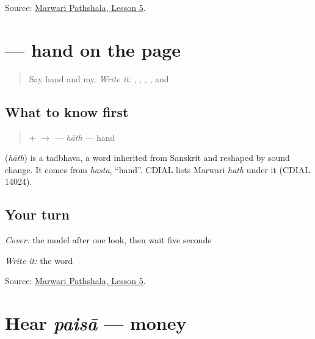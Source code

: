 \begin{tcolorbox}[breakable,colback=teal!4,colframe=teal!35!black,title={Before you move on}]
Source: \href{https://www.marwaripathshala.com/marwari-lesson-5-english}{Marwari Pathshala, Lesson 5}.
\end{tcolorbox}
\section[\texorpdfstring{\mw{हाथ} (hāth)}{हाथ (hāth)}]{ — hand on the page}

\label{lesson:MW-C10-haath}



\begin{quote}
Say hand and my. \emph{Write it:} \textbf{}, \textbf{}, \textbf{}, \textbf{}, and \textbf{}
\end{quote}

\subsection*{What to know first}
\begin{quote}
\textbf{} + \textbf{} $\to$ \textbf{} — \emph{hāth} — hand
\end{quote}

\begin{cousinweb}
\textbf{} (\emph{hāth}) is a tadbhava, a word inherited from Sanskrit and reshaped by sound change. It comes from \emph{hasta}, \textquotedblleft{}hand\textquotedblright{}. CDIAL lists Marwari \emph{hāth} under it (CDIAL 14024).
\end{cousinweb}

\subsection*{Your turn}
\emph{Cover:} the model after one look, then wait five seconds

\emph{Write it:} the word

\begin{tcolorbox}[breakable,colback=teal!4,colframe=teal!35!black,title={Before you move on}]
Source: \href{https://www.marwaripathshala.com/marwari-lesson-5-english}{Marwari Pathshala, Lesson 5}.
\end{tcolorbox}
\section[paisā]{Hear \emph{paisā} — money}

